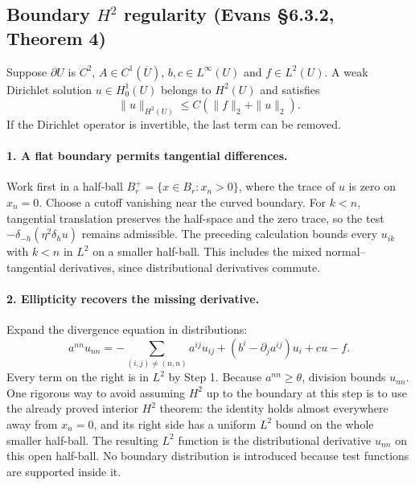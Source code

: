 \Needspace{35mm}
\subsection{Boundary $H^2$ regularity (Evans \S6.3.2, Theorem 4)}
\begin{theorem}\label{thm:6-boundary-h2}
Suppose $\partial U$ is $C^2$, $A\in C^1(\overline U)$,
$b,c\in L^\infty(U)$ and $f\in L^2(U)$. A weak Dirichlet solution
$u\in H^1_0(U)$ belongs to $H^2(U)$ and satisfies
\[
 \|u\|_{H^2(U)}\leq C(\|f\|_2+\|u\|_2).
\]
If the Dirichlet operator is invertible, the last term can be removed.
\end{theorem}
\begin{expandedproof}

\Needspace{45mm}
\paragraph{1. A flat boundary permits tangential differences.}
Work first in a half-ball $B^+_r=\{x\in B_r:x_n>0\}$, where the trace of
$u$ is zero on $x_n=0$. Choose a cutoff vanishing near the curved boundary.
For $k<n$, tangential translation preserves the half-space and the zero
trace, so the test
$-\delta_{-h}(\eta^2\delta_hu)$ remains admissible.
The preceding calculation bounds every $u_{ik}$ with $k<n$ in $L^2$
on a smaller half-ball. This includes the mixed normal--tangential
derivatives, since distributional derivatives commute.

\Needspace{45mm}
\paragraph{2. Ellipticity recovers the missing derivative.}
Expand the divergence equation in distributions:
\begin{equation}\label{eq:6-normal-recovery}
 a^{nn}u_{nn}
 =-\sum_{(i,j)\ne(n,n)}a^{ij}u_{ij}
   +(b^i-\partial_j a^{ij})u_i+cu-f.
\end{equation}
Every term on the right is in $L^2$ by Step 1.
Because $a^{nn}\geq\theta$, division bounds $u_{nn}$.
One rigorous way to avoid assuming $H^2$ up to the boundary at this
step is to use the already proved interior $H^2$ theorem: the identity
holds almost everywhere away from $x_n=0$, and its right side has
a uniform $L^2$ bound on the whole smaller half-ball.
The resulting $L^2$ function is the distributional derivative
$u_{nn}$ on this open half-ball. No boundary distribution is introduced
because test functions are supported inside it.


\end{expandedproof}
